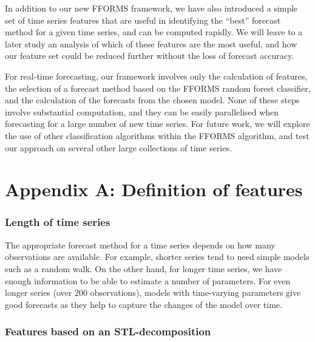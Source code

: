\documentclass[11pt,a4paper,]{article}
\begin{document}
In addition to our new FFORMS framework, we have also introduced a simple set of time series features that are useful in identifying the ``best'' forecast method for a given time series, and can be computed rapidly. We will leave to a later study an analysis of which of these features are the most useful, and how our feature set could be reduced further without the loss of forecast accuracy.

For real-time forecasting, our framework involves only the calculation of features, the selection of a forecast method based on the FFORMS random forest classifier, and the calculation of the forecasts from the chosen model. None of these steps involve substantial computation, and they can be easily parallelised when forecasting for a large number of new time series. For future work, we will explore the use of other classification algorithms within the FFORMS algorithm, and test our approach on several other large collections of time series.

\hypertarget{appendix-a-definition-of-features}{%
\section*{Appendix A: Definition of features}\label{appendix-a-definition-of-features}}

\hypertarget{length-of-time-series}{%
\subsubsection*{Length of time series}\label{length-of-time-series}}

The appropriate forecast method for a time series depends on how many observations are available. For example, shorter series tend to need simple models such as a random walk. On the other hand, for longer time series, we have enough information to be able to estimate a number of parameters. For even longer series (over 200 observations), models with time-varying parameters give good forecasts as they help to capture the changes of the model over time.

\hypertarget{features-based-on-an-stl-decomposition}{%
\subsubsection*{Features based on an STL-decomposition}\label{features-based-on-an-stl-decomposition}}
\end{document}
